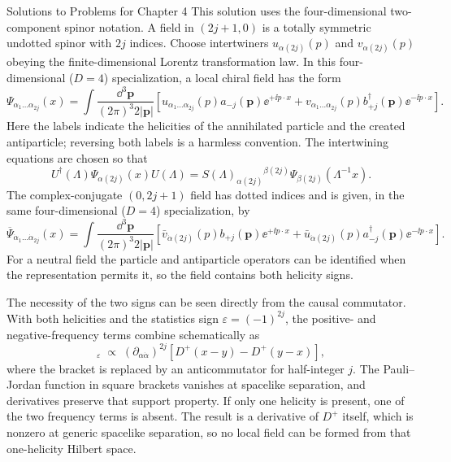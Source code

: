\begin{bankssolutions}{Solutions to Problems for Chapter 4}
This solution uses the four-dimensional two-component spinor notation.  A field in
$(2j+1,0)$ is a totally
symmetric undotted spinor with $2j$ indices.  Choose intertwiners
$u_{\alpha(2j)}(p)$ and $v_{\alpha(2j)}(p)$ obeying the finite-dimensional
Lorentz transformation law.  In this four-dimensional ($D=4$) specialization,
a local chiral field has the form
\begin{equation*}
 \Psi_{\alpha_1\ldots\alpha_{2j}}(x)
 =\int\frac{\dd^3\mathbf p}{(2\pi)^3 2|\mathbf p|}
 \left[u_{\alpha_1\ldots\alpha_{2j}}(p)a_{-j}(\mathbf p)\ee^{+\ii p\cdot x}
 +v_{\alpha_1\ldots\alpha_{2j}}(p)b_{+j}^\dagger(\mathbf p)\ee^{-\ii p\cdot x}\right].
\end{equation*}
Here the labels indicate the helicities of the annihilated particle and the
created antiparticle; reversing both labels is a harmless convention.  The
intertwining equations are chosen so that
\begin{equation*}
 U^\dagger(\Lambda)\Psi_{\alpha(2j)}(x)U(\Lambda)
 =S(\Lambda)_{\alpha(2j)}{}^{\beta(2j)}
 \Psi_{\beta(2j)}(\Lambda^{-1}x).
\end{equation*}
The complex-conjugate $(0,2j+1)$ field has dotted indices and is given, in the
same four-dimensional ($D=4$) specialization, by
\begin{equation*}
 \overline\Psi_{\dot\alpha_1\ldots\dot\alpha_{2j}}(x)
 =\int\frac{\dd^3\mathbf p}{(2\pi)^3 2|\mathbf p|}
 \left[\bar v_{\dot\alpha(2j)}(p)b_{+j}(\mathbf p)\ee^{+\ii p\cdot x}
 +\bar u_{\dot\alpha(2j)}(p)a_{-j}^\dagger(\mathbf p)\ee^{-\ii p\cdot x}\right].
\end{equation*}
For a neutral field the particle and antiparticle operators can be identified
when the representation permits it, so the field contains both helicity signs.

The necessity of the two signs can be seen directly from the causal
commutator.  With both helicities and the statistics sign
$\varepsilon=(-1)^{2j}$, the positive- and negative-frequency terms combine
schematically as
\begin{equation*}
 [\Psi(x),\overline\Psi(y)]_{\varepsilon}
 \;\propto\;
 (\partial_{\alpha\dot\alpha})^{2j}
 \left[D^+(x-y)-D^+(y-x)\right],
\end{equation*}
where the bracket is replaced by an anticommutator for half-integer $j$.
The Pauli--Jordan function in square brackets vanishes at spacelike separation,
and derivatives preserve that support property.  If only one helicity is
present, one of the two frequency terms is absent.  The result is a derivative
of $D^+$ itself, which is nonzero at generic spacelike separation, so no local
field can be formed from that one-helicity Hilbert space.


\end{bankssolutions}
